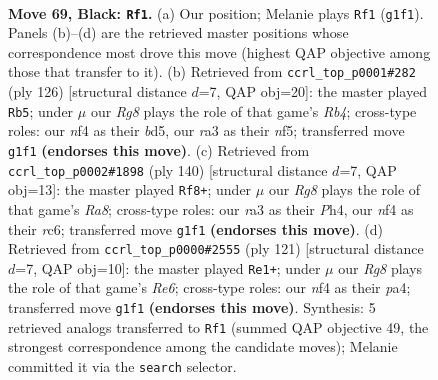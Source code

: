 \documentclass[11pt]{article}
\begin{document}
\clearpage

\begin{figure}[p]\centering
\begin{subfigure}{0.46\textwidth}\centering
\resizebox{\linewidth}{!}{%
\newchessgame
\chessboard[
  setfen={8/8/8/1k6/5N2/R7/3K2P1/6r1 b - - 3 69},
  showmover=false,
  pgfstyle=straightmove, color=movearrow, markmove={g1-f1}
]}
\caption{}
\end{subfigure}\hfill
\begin{subfigure}{0.46\textwidth}\centering
\resizebox{\linewidth}{!}{%
\newchessgame
\chessboard[
  setfen={8/8/7k/3b1n2/1R6/1p6/8/6K1 w - - 0 64},
  showmover=false,
  pgfstyle=straightmove, color=movearrow, markmove={b4-b5}
]}
\caption{}
\end{subfigure}
\\[4pt]
\begin{subfigure}{0.46\textwidth}\centering
\resizebox{\linewidth}{!}{%
\newchessgame
\chessboard[
  setfen={R7/8/p1r5/5k2/3K3P/8/8/8 w - - 0 71},
  showmover=false,
  pgfstyle=straightmove, color=movearrow, markmove={a8-f8}
]}
\caption{}
\end{subfigure}\hfill
\begin{subfigure}{0.46\textwidth}\centering
\resizebox{\linewidth}{!}{%
\newchessgame
\chessboard[
  setfen={8/3k4/R7/8/P7/2P1r3/8/2K5 b - - 16 61},
  showmover=false,
  pgfstyle=straightmove, color=movearrow, markmove={e3-e1}
]}
\caption{}
\end{subfigure}
\caption{\textbf{Move 69, Black: \texttt{Rf1}.} (a) Our position; Melanie plays \texttt{Rf1} (\texttt{g1f1}). Panels (b)--(d) are the retrieved master positions whose correspondence most drove this move (highest QAP objective among those that transfer to it). (b) Retrieved from \texttt{ccrl\_top\_p0001\#282} (ply 126) [structural distance $d$=7, QAP obj=20]: the master played \texttt{Rb5}; under $\mu$ our \emph{Rg8} plays the role of that game's \emph{Rb4}; cross-type roles: our \emph{n}f4 as their \emph{b}d5, our \emph{r}a3 as their \emph{n}f5; transferred move \texttt{g1f1} \textbf{(endorses this move)}. (c) Retrieved from \texttt{ccrl\_top\_p0002\#1898} (ply 140) [structural distance $d$=7, QAP obj=13]: the master played \texttt{Rf8+}; under $\mu$ our \emph{Rg8} plays the role of that game's \emph{Ra8}; cross-type roles: our \emph{r}a3 as their \emph{P}h4, our \emph{n}f4 as their \emph{r}c6; transferred move \texttt{g1f1} \textbf{(endorses this move)}. (d) Retrieved from \texttt{ccrl\_top\_p0000\#2555} (ply 121) [structural distance $d$=7, QAP obj=10]: the master played \texttt{Re1+}; under $\mu$ our \emph{Rg8} plays the role of that game's \emph{Re6}; cross-type roles: our \emph{n}f4 as their \emph{p}a4; transferred move \texttt{g1f1} \textbf{(endorses this move)}. Synthesis: 5 retrieved analogs transferred to \texttt{Rf1} (summed QAP objective 49, the strongest correspondence among the candidate moves); Melanie committed it via the \texttt{search} selector.}
\label{fig:thought-m137}
\end{figure}
\end{document}
